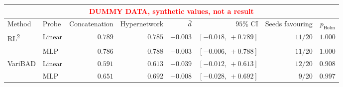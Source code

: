 \setlength{\tabcolsep}{4pt}
\begin{tabular}{llrrrrrr}
\toprule
\multicolumn{8}{c}{\textcolor{red}{\footnotesize DUMMY DATA, synthetic values, not a result}} \\
\hline
Method & Probe & Concatenation & Hypernetwork & $\bar{d}$ & $95\%$ CI & Seeds favouring & $p_{\text{Holm}}$ \\
\midrule
RL\textsuperscript{2} & Linear & $0.789$ & $0.785$ & $-0.003$ & $[-0.018,\ +0.789]$ & $11/20$ & $1.000$ \\
 & MLP & $0.786$ & $0.788$ & $+0.003$ & $[-0.006,\ +0.788]$ & $11/20$ & $1.000$ \\
\cmidrule(l){2-8}
VariBAD & Linear & $0.591$ & $0.613$ & $+0.039$ & $[-0.012,\ +0.613]$ & $12/20$ & $0.908$ \\
 & MLP & $0.651$ & $0.692$ & $+0.008$ & $[-0.028,\ +0.692]$ & $9/20$ & $0.997$ \\
\bottomrule
\end{tabular}
